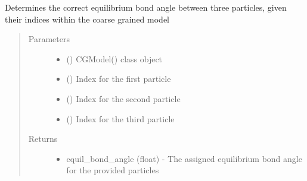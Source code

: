 \documentclass[letterpaper,12pt,english,openany,oneside]{sphinxmanual}
\begin{document}
\begin{fulllineitems}
\begin{fulllineitems}
\begin{quote}
\begin{description}
\begin{itemize}
\end{itemize}


\end{description}\end{quote}

\end{fulllineitems}


\begin{fulllineitems}
\label{\detokenize{cg_model:cg_model.cgmodel.CGModel.get_equil_bond_angle}}
Determines the correct equilibrium bond angle between three particles, given their indices within the coarse grained model
\begin{quote}\begin{description}
\item[{Parameters}] \leavevmode\begin{itemize}
\item {} 
 () \textendash{} CGModel() class object

\item {} 
 () \textendash{} Index for the first particle

\item {} 
 () \textendash{} Index for the second particle

\item {} 
 () \textendash{} Index for the third particle

\end{itemize}

\item[{Returns}] \leavevmode
\begin{itemize}
\item {} 
equil\_bond\_angle (float) - The assigned equilibrium bond angle for the provided particles


\end{itemize}
\end{description}
\end{quote}
\end{fulllineitems}
\end{fulllineitems}
\end{document}
